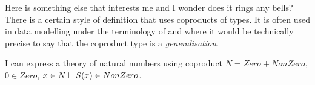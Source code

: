 \documentclass[10pt,a4paper]{article}
\theoremstyle{remark}
\begin{document}
\note Here is something else that interests me and I wonder does it rings any bells?
There is a certain style of definition that uses coproducts of types. It is often used in data modelling 
under the terminology of  and where it would be technically precise to say that the
coproduct type is a \textit{generalisation}.
  
I can express a theory of natural numbers using coproduct $N = Zero + NonZero$,
$0 \in Zero$, $x \in N \vdash S(x) \in NonZero$.   


 

\end{document}
